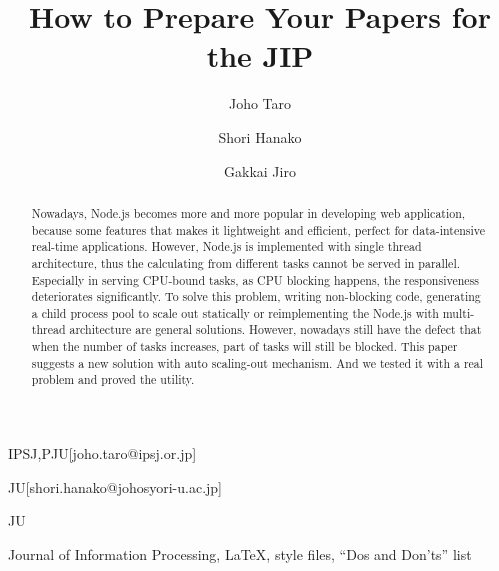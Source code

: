 \documentclass[JIP]{ipsj}
\begin{document}
\title{How to Prepare Your Papers for the JIP}


\author{Joho Taro}{IPSJ,PJU}[joho.taro@ipsj.or.jp]
\author{Shori Hanako}{JU}[shori.hanako@johosyori-u.ac.jp]
\author{Gakkai Jiro}{JU}

\begin{abstract}
Nowadays, Node.js becomes more and more popular in developing web application, because some features that makes it lightweight and efficient, perfect for data-intensive real-time applications.
However, Node.js is implemented with single thread architecture, thus the calculating from different tasks cannot be served in parallel.
Especially in serving CPU-bound tasks, as CPU blocking happens, the responsiveness deteriorates significantly.
To solve this problem, writing non-blocking code, generating a child process pool to scale out statically or reimplementing the Node.js with multi-thread architecture are general solutions.
However, nowadays still have the defect that when the number of tasks increases, part of tasks will still be blocked.
This paper suggests a new solution with auto scaling-out mechanism. And we tested it with a real problem and proved the utility.
\end{abstract}

\begin{keyword}
Journal of Information Processing, \LaTeX, style files, ``Dos and
 Don'ts'' list
\end{keyword}

\maketitle
\end{document}
